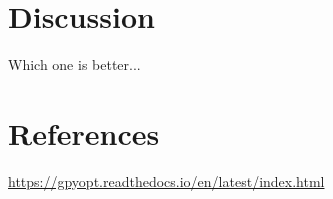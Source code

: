 \documentclass[12pt,fleqn]{article}
\begin{document}
\section{Discussion}
Which one is better... 

\section{References}
\url{https://gpyopt.readthedocs.io/en/latest/index.html}
 
\end{document}
